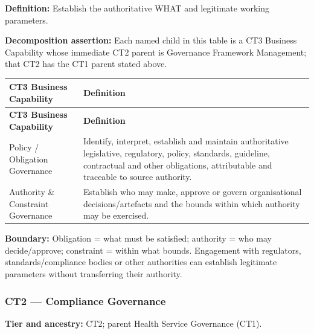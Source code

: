 \label{rad:business:1007}

\textbf{Definition:} Establish the authoritative WHAT and legitimate working parameters.

\label{rad:business:1009}

\textbf{Decomposition assertion:} Each named child in this table is a CT3 Business Capability whose immediate CT2 parent is Governance Framework Management; that CT2 has the CT1 parent stated above.

\label{rad:business:1011}
\begingroup\small\setlength{\TableWidth}{\dimexpr\linewidth-4\tabcolsep-3\arrayrulewidth\relax}
\begin{longtable}{|>{\raggedright\arraybackslash}p{0.35\TableWidth}|>{\raggedright\arraybackslash}p{0.65\TableWidth}|}
\hline\rowcolor{TableHead}\textbf{CT3 Business Capability} & \textbf{Definition}\\\hline\endfirsthead
\hline\rowcolor{TableHead}\textbf{CT3 Business Capability} & \textbf{Definition}\\\hline\endhead
\hline\endfoot
Policy /\allowbreak{} Obligation Governance & Identify, interpret, establish and maintain authoritative legislative, regulatory, policy, standards, guideline, contractual and other obligations, attributable and traceable to source authority.\\\hline
Authority \& Constraint Governance & Establish who may make, approve or govern organisational decisions/\allowbreak{}artefacts and the bounds within which authority may be exercised.\\\hline
\end{longtable}\endgroup
{}\label{rad:business:1016}

\textbf{Boundary:} Obligation = what must be satisfied; authority = who may decide/\allowbreak{}approve; constraint = within what bounds. Engagement with regulators, standards/\allowbreak{}compliance bodies or other authorities can establish legitimate parameters without transferring their authority.

\label{rad:business:1018}
\subsubsection*{CT2 — Compliance Governance}
\label{rad:business:1020}

\textbf{Tier and ancestry:} CT2; parent Health Service Governance (CT1).

\label{rad:business:1022}

